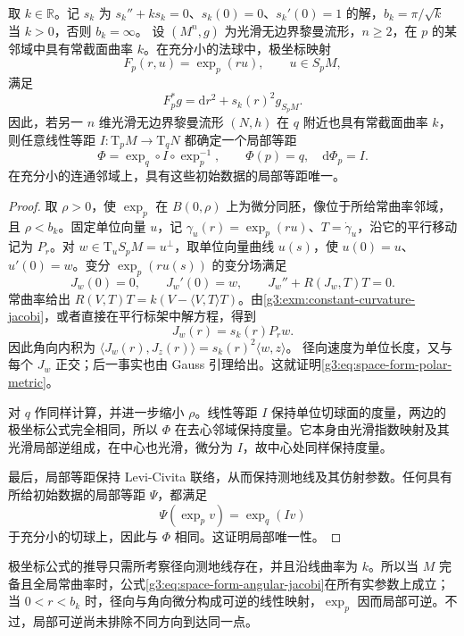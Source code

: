 \begin{proposition}\label{g3:prop:space-form-local-model}
	取 \(k\in\mathbb R\)。记 \(s_k\) 为 \(s_k''+ks_k=0\)、\(s_k(0)=0\)、\(s_k'(0)=1\) 的解，\(b_k=\pi/\sqrt k\) 当 \(k>0\)，否则 \(b_k=\infty\)。
	设 \((M^n,g)\) 为光滑无边界黎曼流形，\(n\ge2\)，在 \(p\) 的某邻域中具有常截面曲率 \(k\)。在充分小的法球中，极坐标映射
	\[
		F_p(r,u)=\exp_p(ru),\qquad u\in S_pM,
	\]
	满足
	\begin{equation}\label{g3:eq:space-form-polar-metric}
		F_p^*g=\mathrm dr^2+s_k(r)^2g_{S_pM}.
	\end{equation}
	因此，若另一 \(n\) 维光滑无边界黎曼流形 \((N,h)\) 在 \(q\) 附近也具有常截面曲率 \(k\)，则任意线性等距
	\(I:\mathrm T_pM\to\mathrm T_qN\) 都确定一个局部等距
	\[
		\Phi=\exp_q\circ I\circ\exp_p^{-1},
		\qquad \Phi(p)=q,\quad \mathrm d\Phi_p=I.
	\]
	在充分小的连通邻域上，具有这些初始数据的局部等距唯一。
\end{proposition}
\begin{proof}
	取 \(\rho>0\)，使 \(\exp_p\) 在 \(B(0,\rho)\) 上为微分同胚，像位于所给常曲率邻域，且 \(\rho<b_k\)。固定单位向量 \(u\)，记 \(\gamma_u(r)=\exp_p(ru)\)、\(T=\dot\gamma_u\)，沿它的平行移动记为 \(P_r\)。对 \(w\in\mathrm T_uS_pM=u^\perp\)，取单位向量曲线 \(u(s)\)，使 \(u(0)=u\)、\(u'(0)=w\)。变分 \(\exp_p(ru(s))\) 的变分场满足
	\[
		J_w(0)=0,\qquad J_w'(0)=w,\qquad
		J_w''+R(J_w,T)T=0.
	\]
	常曲率给出 \(R(V,T)T=k(V-\langle V,T\rangle T)\)。由\cref{g3:exm:constant-curvature-jacobi}，或者直接在平行标架中解方程，得到
	\begin{equation}\label{g3:eq:space-form-angular-jacobi}
		J_w(r)=s_k(r)P_rw.
	\end{equation}
	因此角向内积为
	\(\langle J_w(r),J_z(r)\rangle=s_k(r)^2\langle w,z\rangle\)。
	径向速度为单位长度，又与每个 \(J_w\) 正交；后一事实也由 Gauss 引理给出。这就证明\eqref{g3:eq:space-form-polar-metric}。

	对 \(q\) 作同样计算，并进一步缩小 \(\rho\)。线性等距 \(I\) 保持单位切球面的度量，两边的极坐标公式完全相同，所以 \(\Phi\) 在去心邻域保持度量。它本身由光滑指数映射及其光滑局部逆组成，在中心也光滑，微分为 \(I\)，故中心处同样保持度量。

	最后，局部等距保持 Levi-Civita 联络，从而保持测地线及其仿射参数。任何具有所给初始数据的局部等距 \(\Psi\)，都满足
	\[
		\Psi(\exp_p v)=\exp_q(Iv)
	\]
	于充分小的切球上，因此与 \(\Phi\) 相同。这证明局部唯一性。
\end{proof}

极坐标公式的推导只需所考察径向测地线存在，并且沿线曲率为 \(k\)。所以当 \(M\) 完备且全局常曲率时，公式\eqref{g3:eq:space-form-angular-jacobi}在所有实参数上成立；当 \(0<r<b_k\) 时，径向与角向微分构成可逆的线性映射，\(\exp_p\) 因而局部可逆。不过，局部可逆尚未排除不同方向到达同一点。

